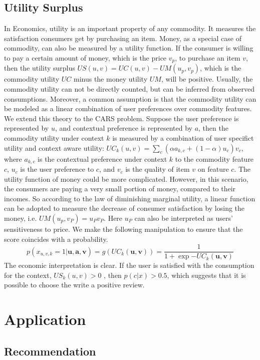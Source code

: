 \documentclass{llncs}
\begin{document}
\subsection{Utility Surplus}
In Economics, utility is an important property of any commodity. It measures the satisfaction consumers get by purchasing an item. Money, as a special case of commodity, can also be measured by a utility function. If the consumer is willing to pay a certain amount of money, which is the price $v_p$, to purchase an item $v$, then the utility surplus $US(u,v)=UC(u,v)-UM(u_p,v_p)$, which is the commodity utility $UC$ minus the money utility $UM$, will be positive.
Usually, the commodity utility can not be directly counted, but can be inferred from observed consumptions. Moreover, a common assumption is that the commodity utility can be modeled as a linear combination of user preferences over commodity features. We extend this theory to the CARS problem. Suppose the user preference is represented by $u$, and contextual preference is represented by $a$, then the commodity utility under context $k$ is measured by a combination of user specifict utility and context aware utility: $UC_k(u,v)= \sum_c (\alpha a_{k,c} + (1-\alpha) u_c) v_c$, where $a_{k,c}$ is the contextual preference under context $k$ to the commodity feature $c$, $u_c$ is the user preference to $c$, and $v_c$ is the quality of item $v$ on feature $c$.
The utility function of money could be more complicated. However, in this scenario, the consumers are paying a very small portion of money, compared to their incomes. So according to the law of diminishing marginal utility, a linear function can be adopted to measure the decrease of consumer satisfaction by losing the money, i.e. $UM(u_p,v_P)=u_P v_P$. Here $u_P$ can also be interpreted as users' sensitiveness to price.
We make the following manipulation to ensure that the score coincides with a probability.
\begin{equation}\label{equ:pcx}
p(x_{u,v,k}=1|\mathbf{u,a,v})=g(UC_k(\mathbf{u,v}))=\frac{1}{1+\exp{-UC_k(\mathbf{u,v})}}
\end{equation}
The economic interpretation is clear. If the user is satisfied with the consumption for the context, $US_k(u,v)>0$ , then $p(c|x)>0.5$, which suggests that it is possible to choose the write a positive review.
\section{Application}\label{sec:method}
\subsection{ Recommendation}
\end{document}

